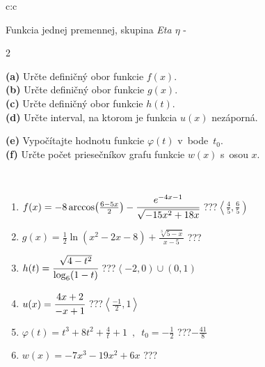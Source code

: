 \documentclass[10pt]{report}
\begin{document}
\begin{tabular}{c:c}
\begin{minipage}[c][104.5mm][t]{0.5\linewidth}
\begin{center}
\vspace{7mm}
{\huge Funkcia jednej premennej, skupina \textit{Eta $\eta$} -}\\[5mm]
\begin{minipage}{0.95\linewidth}
\begin{center}
{\small \begin{multicols}{2} \raggedright
\textbf{(a)} Určte definičný obor funkcie \(f(x)\). \\[1mm]
\textbf{(b)} Určte definičný obor funkcie \(g(x)\). \\[1mm]
\textbf{(c)} Určte definičný obor funkcie \(h(t)\). \\[1mm]
\textbf{(d)} Určte interval, na ktorom je funkcia \(u(x)\) nezáporná. \par \columnbreak
\textbf{(e)} Vypočítajte hodnotu funkcie \(\varphi(t)\) v~bode~\(t_0\). \\[1mm]
\textbf{(f)} Určte počet priesečníkov grafu funkcie \(w(x)\) s~osou \(x\). \\[1mm]
\end{multicols}
}
\end{center}
\end{minipage}
\\[4mm]
\begin{minipage}{0.79\linewidth}
\begin{center}
\begin{varwidth}{\linewidth}
\begin{enumerate}
\small
\item $f(x) = -8\arccos\!\left( \frac{6-5x}{2} \right) - \cfrac{e^{-4x-1}}{\sqrt{-15x^2+18x}}$\quad \dotfill\; ???\;\dotfill \quad $\left\langle\frac{4}{5} , \frac{6}{5}\right)$
\item $g(x) = \frac{1}{2} \ln{\!(x^2-2x-8)}+\frac{\sqrt[3]{5-x}}{x-5}$\quad \dotfill\; ???\;\dotfill {}
\item $h(t) = \cfrac{\sqrt{4-t^2}}{\log_6(1-t)}$\quad \dotfill\; ???\;\dotfill \quad $\left\langle-2 , 0\right)\cup\left(0 , 1\right)$
\item $u(x) = \cfrac{4x+2}{-x+1}$\quad \dotfill\; ???\;\dotfill \quad $\left\langle\frac{-1}{2} , 1\right\rangle$
\item $\varphi(t) = t^3+8t^2+\frac{4}{t}+1 \enspace , \enspace t_0=-\frac{1}{2}$\quad \dotfill\; ???\;\dotfill \quad $-\frac{41}{8}$
\item $w(x) = -7x^3-19x^2+6x$\quad \dotfill\; ???\;\dotfill {}

\end{enumerate}
\end{varwidth}
\end{center}
\end{minipage}
\end{center}
\end{minipage}
\end{tabular}
\end{document}
